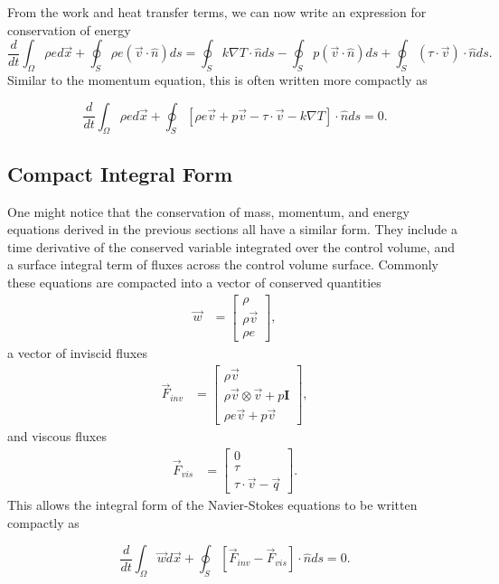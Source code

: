 From the work and heat transfer terms, we can now write an expression for conservation of energy
\begin{equation}
\frac{d}{dt}\int_\Omega \rho e d\vec{x} + \oint_S \rho e (\vec{v} \cdot \hat{n}) ds = \oint_S k \nabla T \cdot \hat{n} ds - \oint_S p(\vec{v} \cdot \hat{n}) ds + \oint_S (\tau \cdot \vec{v})\cdot \hat{n} ds.
\end{equation}
Similar to the momentum equation, this is often written more compactly as
\begin{eqBox}
\begin{equation}
\frac{d}{dt}\int_\Omega \rho e d\vec{x} + \oint_S \left[ \rho e \vec{v} + p\vec{v} - \tau \cdot \vec{v} - k \nabla T \right] \cdot \hat{n} ds = 0.
\end{equation}
\end{eqBox}

\subsection{Compact Integral Form}
One might notice that the conservation of mass, momentum, and energy equations derived in the previous sections all have a similar form. They include a time derivative of the conserved variable integrated over the control volume, and a surface integral term of fluxes across the control volume surface. Commonly these equations are compacted into a vector of conserved quantities
\begin{align}
	\vec{w} &= \begin{bmatrix}
		\rho \\
	    \rho \vec{v} \\
	    \rho e
	\end{bmatrix},
\end{align}
a vector of inviscid fluxes
\begin{align}
	\vec{F}_{inv} &= \begin{bmatrix}
		\rho \vec{v} \\
	    \rho \vec{v} \otimes \vec{v} + p \mathbf{I} \\
	    \rho e \vec{v} + p\vec{v}
	\end{bmatrix},
\end{align}
and viscous fluxes
\begin{align}
	\vec{F}_{vis} &= \begin{bmatrix}
		0 \\
	    \tau \\
	    \tau \cdot \vec{v} - \vec{q}
	\end{bmatrix}.
\end{align}
This allows the integral form of the Navier-Stokes equations to be written compactly as
\begin{eqBox}
\begin{equation}
\label{eqn:compactintegral}
\frac{d}{dt}\int_\Omega \vec{w} d\vec{x} + \oint_S \left[\vec{F}_{inv} - \vec{F}_{vis}\right] \cdot \hat{n} ds = 0.
\end{equation}
\end{eqBox}



